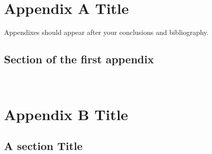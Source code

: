 \documentclass[11pt]{report}
\numberwithin{equation}{chapter}		%
\numberwithin{figure}{chapter}			%
\numberwithin{table}{chapter}			%
\begin{document}
	\newpage
	\thispagestyle{empty} \ \newpage

	\printbibliography[title=References]

	\newpage
	\thispagestyle{empty} \ \newpage

	\appendix
	\chapter{Appendix A Title}
	Appendixes should appear after your conclusions and bibliography.
	\section{Section of the first appendix}
	\lipsum[3]


	\newpage
	\thispagestyle{empty} \ \newpage
	\chapter{Appendix B Title}
	\lipsum[2]

	\section{A section Title}
	\lipsum[3]
\end{document}
